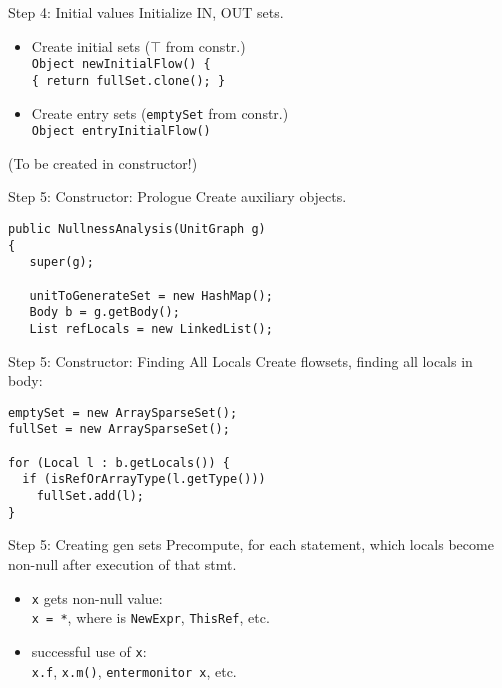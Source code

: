 \begin{slide}{Step 4: Initial values}
\vspace*{-0.1in}
Initialize IN, OUT sets.
\begin{itemize}

\item Create initial sets ($\top$ from constr.)\\
{\tt Object newInitialFlow() \{\\
\qquad \tt \{ return fullSet.clone(); \} }

\vspace*{0.1in}

\item Create entry sets ({\tt emptySet} from constr.)\\
{\tt Object entryInitialFlow()}\\
\end{itemize}

(To be created in constructor!)
\end{slide}

\begin{slide}{Step 5: Constructor: Prologue}
\vspace*{-0.1in}
Create auxiliary objects.
\vspace*{0.05in}
\begin{verbatim}
public NullnessAnalysis(UnitGraph g)
{
   super(g);

   unitToGenerateSet = new HashMap();
   Body b = g.getBody();
   List refLocals = new LinkedList();
\end{verbatim}
\end{slide}

\begin{slide}{Step 5: Constructor: Finding All Locals}
\vspace*{-0.2in}
Create flowsets, finding all locals in body:

\vspace*{-0.05in}
\begin{verbatim}
emptySet = new ArraySparseSet();
fullSet = new ArraySparseSet();

for (Local l : b.getLocals()) {
  if (isRefOrArrayType(l.getType()))
    fullSet.add(l);
}
\end{verbatim}
\end{slide}

\begin{slide}{Step 5: Creating gen sets}
Precompute, for each statement, which locals become non-null after execution of that stmt.

\begin{itemize}
\item {\tt x} gets non-null value:\\
{\tt x = *}, where {\tt *} is {\tt NewExpr}, {\tt ThisRef}, etc.
\item successful use of {\tt x}:\\
{\tt x.f}, {\tt x.m()}, {\tt entermonitor x}, etc.
\end{itemize}
\end{slide}

